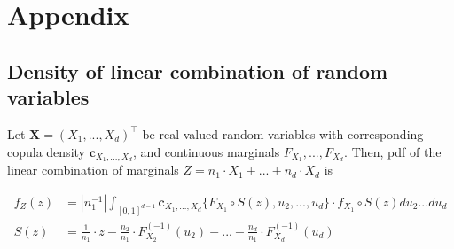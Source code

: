 \newpage
\section{Appendix}\label{sec:appendix}
\subsection{Density of linear combination of random variables}
\begin{proposition}
   Let $\bm{X} = (X_1, ..., X_d)^\top$ be real-valued random variables with corresponding
   copula density $\bm{c}_{X_1, ..., X_d}$, and continuous marginals $F_{X_1}, ..., F_{X_d}$.
   Then,
   pdf of the linear combination of marginals $Z = n_1 \cdot X_1 + ... +  n_d \cdot X_d $ is

   \begin{align}
   f_Z(z) &= \left| n_1^{-1} \right| \int_{[0,1]^{d-1}} \bm{c}_{X_1,...,X_d}
      \{F_{X_1} \circ S(z), u_2, ..., u_d \} \cdot
      f_{X_1} \circ S(z) du_2 ... du_d \label{density} \\
      S(z) &= \frac{1}{n_1}\cdot z - \frac{n_2}{n_1} \cdot F^{(-1)}_{X_2}(u_2) - ... -  \frac{n_d}{n_1} \cdot F^{(-1)}_{X_d}(u_d)
      \end{align}
   \end{proposition}

